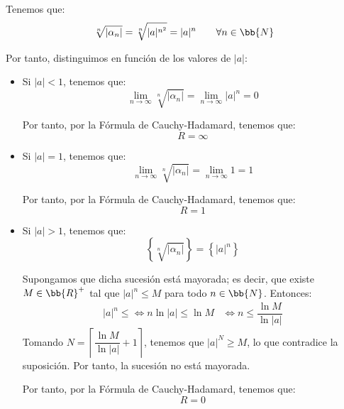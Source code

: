 \begin{ejercicio}
\begin{enumerate}
        Tenemos que:
        \begin{equation*}
            \sqrt[n]{|\alpha_n|} = \sqrt[n]{|a|^{n^2}} = |a|^n\qquad \forall n\in \bb{N}
        \end{equation*}

        Por tanto, distinguimos en función de los valores de $|a|$:
        \begin{itemize}
            \item Si $|a|<1$, tenemos que:
            \begin{equation*}
                \lim_{n \to \infty} \sqrt[n]{|\alpha_n|} = \lim_{n \to \infty} |a|^n = 0
            \end{equation*}

            Por tanto, por la Fórmula de Cauchy-Hadamard, tenemos que:
            \begin{equation*}
                R = \infty
            \end{equation*}

            \item Si $|a|=1$, tenemos que:
            \begin{equation*}
                \lim_{n \to \infty} \sqrt[n]{|\alpha_n|} = \lim_{n \to \infty} 1 = 1
            \end{equation*}

            Por tanto, por la Fórmula de Cauchy-Hadamard, tenemos que:
            \begin{equation*}
                R = 1
            \end{equation*}

            \item Si $|a|>1$, tenemos que:
            \begin{equation*}
                \left\{\sqrt[n]{|\alpha_n|}\right\} = \left\{|a|^n\right\}
            \end{equation*}

            Supongamos que dicha sucesión está mayorada; es decir, que existe $M\in \bb{R}^+$ tal que $|a|^n\leq M$ para todo $n\in \bb{N}$. Entonces:
            \begin{align*}
                |a|^n \leq \iff n\ln|a|\leq \ln M &\iff n\leq \dfrac{\ln M}{\ln|a|}
            \end{align*}
            Tomando $N=\left\lceil\dfrac{\ln M}{\ln|a|}+1\right\rceil$, tenemos que $|a|^N\geq M$, lo que contradice la suposición. Por tanto, la sucesión no está mayorada.

            Por tanto, por la Fórmula de Cauchy-Hadamard, tenemos que:
            \begin{equation*}
                R = 0
            \end{equation*}
        \end{itemize}
    \end{enumerate}
\end{ejercicio}

